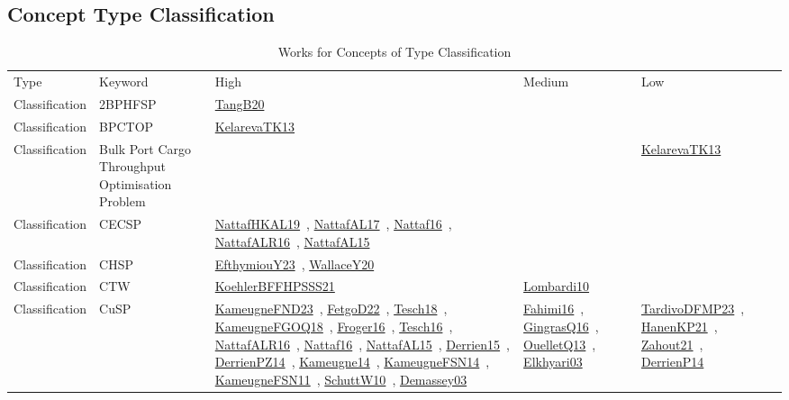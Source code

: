 \clearpage
\subsection{Concept Type Classification}
\label{sec:Classification}
{\scriptsize
\begin{longtable}{lp{3cm}>{\raggedright\arraybackslash}p{6cm}>{\raggedright\arraybackslash}p{6cm}>{\raggedright\arraybackslash}p{8cm}}
\rowcolor{white}\caption{Works for Concepts of Type Classification}\\ \toprule
\rowcolor{white}Type & Keyword & High & Medium & Low\\ \midrule\endhead
\bottomrule
\endfoot
Classification & 2BPHFSP & \href{works/TangB20.pdf}{TangB20}~\cite{TangB20} &  & \\
Classification & BPCTOP & \href{works/KelarevaTK13.pdf}{KelarevaTK13}~\cite{KelarevaTK13} &  & \\
Classification & Bulk Port Cargo Throughput Optimisation Problem &  &  & \href{works/KelarevaTK13.pdf}{KelarevaTK13}~\cite{KelarevaTK13}\\
Classification & CECSP & \href{works/NattafHKAL19.pdf}{NattafHKAL19}~\cite{NattafHKAL19}, \href{works/NattafAL17.pdf}{NattafAL17}~\cite{NattafAL17}, \href{works/Nattaf16.pdf}{Nattaf16}~\cite{Nattaf16}, \href{works/NattafALR16.pdf}{NattafALR16}~\cite{NattafALR16}, \href{works/NattafAL15.pdf}{NattafAL15}~\cite{NattafAL15} &  & \\
Classification & CHSP & \href{works/EfthymiouY23.pdf}{EfthymiouY23}~\cite{EfthymiouY23}, \href{works/WallaceY20.pdf}{WallaceY20}~\cite{WallaceY20} &  & \\
Classification & CTW & \href{works/KoehlerBFFHPSSS21.pdf}{KoehlerBFFHPSSS21}~\cite{KoehlerBFFHPSSS21} & \href{works/Lombardi10.pdf}{Lombardi10}~\cite{Lombardi10} & \\
Classification & CuSP & \href{works/KameugneFND23.pdf}{KameugneFND23}~\cite{KameugneFND23}, \href{works/FetgoD22.pdf}{FetgoD22}~\cite{FetgoD22}, \href{works/Tesch18.pdf}{Tesch18}~\cite{Tesch18}, \href{works/KameugneFGOQ18.pdf}{KameugneFGOQ18}~\cite{KameugneFGOQ18}, \href{works/Froger16.pdf}{Froger16}~\cite{Froger16}, \href{works/Tesch16.pdf}{Tesch16}~\cite{Tesch16}, \href{works/NattafALR16.pdf}{NattafALR16}~\cite{NattafALR16}, \href{works/Nattaf16.pdf}{Nattaf16}~\cite{Nattaf16}, \href{works/NattafAL15.pdf}{NattafAL15}~\cite{NattafAL15}, \href{works/Derrien15.pdf}{Derrien15}~\cite{Derrien15}, \href{works/DerrienPZ14.pdf}{DerrienPZ14}~\cite{DerrienPZ14}, \href{works/Kameugne14.pdf}{Kameugne14}~\cite{Kameugne14}, \href{works/KameugneFSN14.pdf}{KameugneFSN14}~\cite{KameugneFSN14}, \href{works/KameugneFSN11.pdf}{KameugneFSN11}~\cite{KameugneFSN11}, \href{works/SchuttW10.pdf}{SchuttW10}~\cite{SchuttW10}, \href{works/Demassey03.pdf}{Demassey03}~\cite{Demassey03} & \href{works/Fahimi16.pdf}{Fahimi16}~\cite{Fahimi16}, \href{works/GingrasQ16.pdf}{GingrasQ16}~\cite{GingrasQ16}, \href{works/OuelletQ13.pdf}{OuelletQ13}~\cite{OuelletQ13}, \href{works/Elkhyari03.pdf}{Elkhyari03}~\cite{Elkhyari03} & \href{works/TardivoDFMP23.pdf}{TardivoDFMP23}~\cite{TardivoDFMP23}, \href{works/HanenKP21.pdf}{HanenKP21}~\cite{HanenKP21}, \href{works/Zahout21.pdf}{Zahout21}~\cite{Zahout21}, \href{works/DerrienP14.pdf}{DerrienP14}~\cite{DerrienP14}\\

\end{longtable}}
